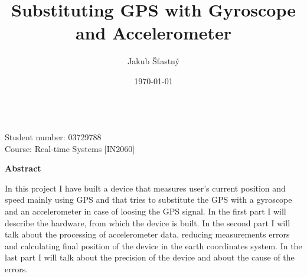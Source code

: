\documentclass[hidelinks,a4paper]{article}
\author{Jakub Šťastný}
\title{Substituting GPS with Gyroscope and Accelerometer}
\date{\today}
\begin{document}
\begin{titlepage}
    \thispagestyle{plain}
    \begin{center}
        \Large
        \textbf{\@title}
            
        \vspace{0.4cm}
        \large
            
        \vspace{0.8cm}
        \textbf{\@author} \\
        {\small Student number: 03729788}\\
        {\small Course: Real-time Systems [IN2060] }
        
        \vspace{16cm}
        \textbf{Abstract}
    \end{center}
    In this project I have built a device that measures user's current position and speed mainly using GPS and that tries to substitute the GPS with a gyroscope and an accelerometer in case of loosing the GPS signal. In the first part I will describe the hardware, from which the device is built. In the second part I will talk about the processing of accelerometer data, reducing measurements errors and calculating final position of the device in the earth coordinates system. In the last part I will talk about the precision of the device and about the cause of the errors. 
\end{titlepage}
\makeatother

\end{document}
